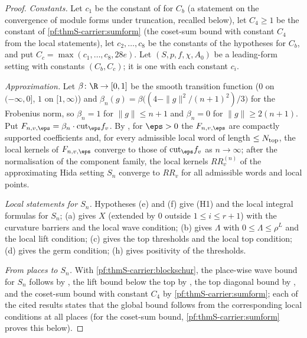 \begin{proof}
\emph{Constants.} Let $c_1$ be the constant of  for $C_b$ (a
statement on the convergence of module forms under truncation, recalled below), let $C_4\ge1$ be the constant of
\cref{pf:thmS-carrier:sumform} (the coset-sum bound with constant $C_4$ from the local statements), let $c_2,\dots,c_8$ be the
constants of the hypotheses for $C_b$, and put
$C_c=\max(c_1,\dots,c_8,28e)$. Let $(S,p,f,\chi,A_0)$ be a leading-form setting with constants $(C_b,C_c)$; it is one with each
constant $c_i$.

\emph{Approximation.} Let $\beta\colon\R\to[0,1]$ be the smooth transition function ($0$ on $(-\infty,0]$, $1$ on $[1,\infty)$)
and $\beta_n(g)=\beta\bigl((4-\|g\|^2/(n+1)^2)/3\bigr)$ for the Frobenius norm, so $\beta_n=1$ for $\|g\|\le n+1$ and
$\beta_n=0$ for $\|g\|\ge2(n+1)$. Put $F_{n,v,\eps}=\beta_n\cdot\mathrm{cut}_\eps f_v$. By
, for $\eps>0$ the $F_{n,v,\eps}$ are compactly supported
coefficients and, for every admissible local word of length $\le N_{\mathrm{top}}$, the local kernels of $F_{n,v,\eps}$ converge
to those of $\mathrm{cut}_\eps f_v$ as $n\to\infty$; after the normalisation of the component family, the local kernels
$RR^{(n)}_v$ of the approximating Hida setting $S_n$ converge to $RR_v$ for all admissible words and local points.

\emph{Local statements for $S_n$.} Hypotheses (e) and (f) give (H1) and the local integral formulas for $S_n$; (a) gives $X$
(extended by $0$ outside $1\le i\le r+1$) with the curvature barriers and the local wave condition; (b) gives $\Lambda$ with
$0\le\Lambda\le\rho^L$ and the local lift condition; (c) gives the top thresholds and the local top condition; (d) gives the
germ condition; (h) gives positivity of the thresholds.

\emph{From places to $S_n$.} With \cref{pf:thmS-carrier:blockschur}, the place-wise wave bound for $S_n$ follows by
, the lift bound below the top by
, the top diagonal bound by
, and the coset-sum bound with constant $C_4$ by
\cref{pf:thmS-carrier:sumform}; each of the cited results states that the global bound follows from the corresponding local
conditions at all places (for the coset-sum bound, \cref{pf:thmS-carrier:sumform} proves this below).


\end{proof}

